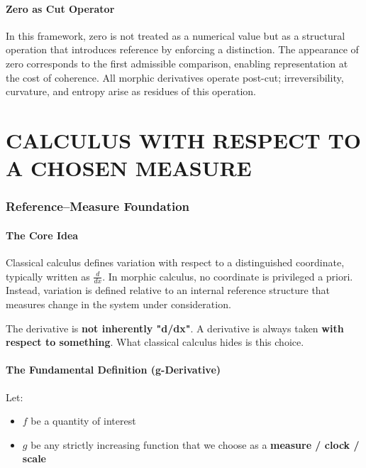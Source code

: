 \documentclass[12pt, oneside]{article}
\begin{document}
\subsection{Zero as Cut Operator}

In this framework, zero is not treated as a numerical value but as a structural operation that introduces reference by enforcing a distinction. The appearance of zero corresponds to the first admissible comparison, enabling representation at the cost of coherence. All morphic derivatives operate post-cut; irreversibility, curvature, and entropy arise as residues of this operation.

\newpage

\part{CALCULUS WITH RESPECT TO A CHOSEN MEASURE}

\section{Reference--Measure Foundation}

\subsection{The Core Idea}

Classical calculus defines variation with respect to a distinguished coordinate, typically written as $\frac{d}{dx}$. In morphic calculus, no coordinate is privileged a priori. Instead, variation is defined relative to an internal reference structure that measures change in the system under consideration.

The derivative is \textbf{not inherently "d/dx"}. A derivative is always taken \textbf{with respect to something}. What classical calculus hides is this choice.

\subsection{The Fundamental Definition (g-Derivative)}

Let:
\begin{itemize}
    \item $f$ be a quantity of interest
    \item $g$ be any strictly increasing function that we choose as a \textbf{measure / clock / scale}
\end{itemize}
\end{document}
